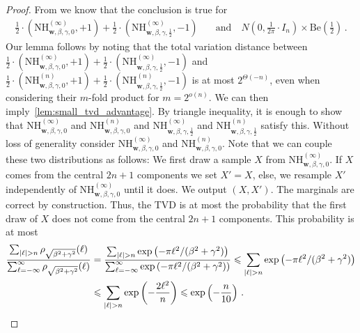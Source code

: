 \documentclass{theoretics}
\newcommand{\Paren}[1]{\left(#1\right)}
\newcommand{\abs}[1]{\lvert#1\rvert}
\renewcommand{\leq}{\leqslant}
\newcommand{\nhclwed}[4]{\mathrm{NH}_{#1,#2,#3,#4}}
\begin{document}
\begin{proof}
    From \cite[Theorem 15]{tiegel_agnostic_lattices} we know that the conclusion is true for 
    \begin{align*}
        \frac 1 2 \cdot \Paren{\nhclwed{\bm w}{\beta}{\gamma}{0}^{(\infty)}, +1} + \frac 1 2 \cdot \Paren{\nhclwed{\bm w}{\beta}{\gamma}{\tfrac 1 2}^{(\infty)}, -1} \quad&\text{and}\quad N\Paren{0, \tfrac 1 {2\pi} \cdot I_n} \times \mathrm{Be}\Paren{\frac 1 2} \,.
    \end{align*}
    Our lemma follows by noting that the total variation distance between $\frac 1 2 \cdot \Paren{\nhclwed{\bm w}{\beta}{\gamma}{0}^{(\infty)}, +1} + \frac 1 2 \cdot \Paren{\nhclwed{\bm w}{\beta}{\gamma}{\tfrac 1 2}^{(\infty)}, -1}$ and $\frac 1 2 \cdot \Paren{\nhclwed{\bm w}{\beta}{\gamma}{0}^{(n)}, +1} + \frac 1 2 \cdot \Paren{\nhclwed{\bm w}{\beta}{\gamma}{\tfrac 1 2}^{(n)}, -1}$ is at most $2^{\Theta(-n)}$, even when considering their $m$-fold product for $m = 2^{o(n)}$.
    We can then imply~\cref{lem:small_tvd_advantage}.
    By triangle inequality, it is enough to show that $\nhclwed{\bm w}{\beta}{\gamma}{0}^{(\infty)}$ and $\nhclwed{\bm w}{\beta}{\gamma}{0}^{(n)}$ and $\nhclwed{\bm w}{\beta}{\gamma}{\tfrac 1 2}^{(\infty)}$ and $\nhclwed{\bm w}{\beta}{\gamma}{\tfrac 1 2}^{(n)}$ satisfy this.
    Without loss of generality consider $\nhclwed{\bm w}{\beta}{\gamma}{0}^{(\infty)}$ and $\nhclwed{\bm w}{\beta}{\gamma}{0}^{(n)}$.
    Note that we can couple these two distributions as follows: We first draw a sample $X$ from $\nhclwed{\bm w}{\beta}{\gamma}{0}^{(\infty)}$.
    If $X$ comes from the central $2n+1$ components we set $X' = X$, else, we resample $X'$ independently of $\nhclwed{\bm w}{\beta}{\gamma}{0}^{(\infty)}$ until it does.
    We output $(X,X')$.
    The marginals are correct by construction.
    Thus, the TVD is at most the probability that the first draw of $X$ does not come from the central $2n+1$ components.
    This probability is at most
    \begin{align*}
        \frac {\sum_{\abs{\ell} > n} \rho_{\sqrt{\beta^2 + \gamma^2}}(\ell)}{\sum_{\ell = -\infty}^\infty \rho_{\sqrt{\beta^2 + \gamma^2}}(\ell)} &= \frac {\sum_{\abs{\ell} > n} \exp\Paren{-\pi\ell^2/(\beta^2+\gamma^2)}}{\sum_{\ell = -\infty}^\infty \exp\Paren{-\pi\ell^2/(\beta^2+\gamma^2)}} \leq \sum_{\abs{\ell} > n} \exp\Paren{-\pi\ell^2/(\beta^2+\gamma^2)} \\
        &\leq \sum_{\abs{\ell} > n} \exp\Paren{- \frac {2\ell^2} n} \leq \exp\Paren{-\frac n {10}} \,. \qedhere
    \end{align*}
\end{proof}
\end{document}
